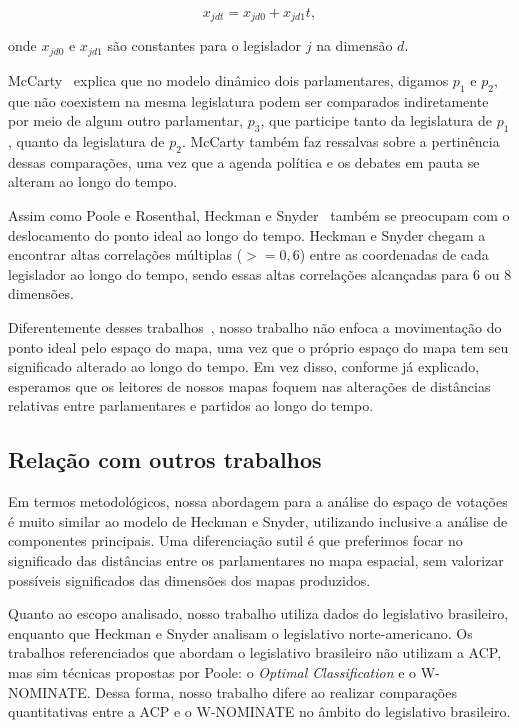 \documentclass[
	article,			%
	12pt,				%
	oneside,			%
	a4paper,			%
	english,			%
	brazil,				%
	sumario=tradicional,
	oldfontcommands %
	]{abntex2}
\newcommand\wnominate{W-NOMINATE\xspace}
\begin{document}
\begin{equation}
x_{jdt} = x_{jd0} + x_{jd1}t,
\label{eq:dwnominate}
\end{equation}

onde $x_{jd0}$ e $x_{jd1}$ são constantes para o legislador $j$ na dimensão $d$.

McCarty~\cite{mccarty2011measuring} explica que no modelo dinâmico dois parlamentares, digamos $p_1$ e $p_2$, que não coexistem na mesma legislatura podem ser comparados indiretamente por meio de algum outro parlamentar, $p_3$, que participe tanto da legislatura de $p_1$, quanto da legislatura de $p_2$. McCarty também faz ressalvas sobre a pertinência dessas comparações, uma vez que a agenda política e os debates em pauta se alteram ao longo do tempo.

Assim como Poole e Rosenthal, Heckman e Snyder~\cite{heckman-snyder1997} também se preocupam com o deslocamento do ponto ideal ao longo do tempo. Heckman e Snyder chegam a encontrar altas correlações múltiplas ($>= 0,6$) entre as coordenadas de cada legislador ao longo do tempo, sendo essas altas correlações alcançadas para 6 ou 8 dimensões. 

Diferentemente desses trabalhos~\cite{poole2001dnomiante, heckman-snyder1997}, nosso trabalho não enfoca a movimentação do ponto ideal pelo espaço do mapa, uma vez que o próprio espaço do mapa tem seu significado alterado ao longo do tempo. Em vez disso, conforme já explicado, esperamos que os leitores de nossos mapas foquem nas alterações de distâncias relativas entre parlamentares e partidos ao longo do tempo.


\subsection{Relação com outros trabalhos}

Em termos metodológicos, nossa abordagem para a análise do espaço de votações é muito similar ao modelo de Heckman e Snyder, utilizando inclusive a análise de componentes principais. Uma diferenciação sutil é que preferimos focar no significado das distâncias entre os parlamentares no mapa espacial, sem valorizar possíveis significados das dimensões dos mapas produzidos.

Quanto ao escopo analisado, nosso trabalho utiliza dados do legislativo brasileiro, enquanto que Heckman e Snyder analisam o legislativo norte-americano. Os trabalhos referenciados que abordam o legislativo brasileiro não utilizam a ACP, mas sim técnicas propostas por Poole: o \emph{Optimal Classification} e o \wnominate. Dessa forma, nosso trabalho difere ao realizar comparações quantitativas entre a ACP e o \wnominate no âmbito do legislativo brasileiro.
\end{document}
